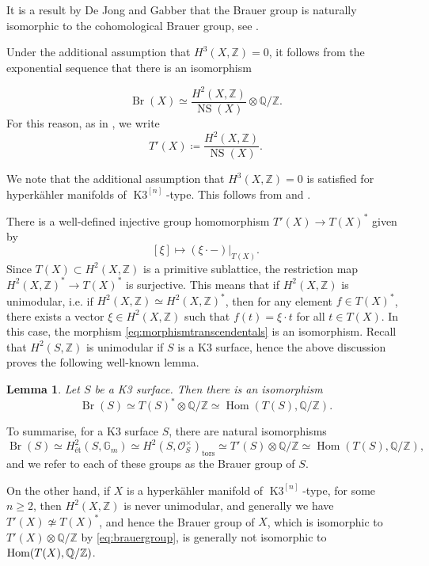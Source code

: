 \documentclass[11pt,twoside]{amsart}
\numberwithin{equation}{section}
\newtheorem{lemma}[dummy]{Lemma}
\theoremstyle{definition}
\theoremstyle{plain}
\newcommand{\Z}{\ensuremath{\mathbb{Z}}}
\newcommand{\Q}{\ensuremath{\mathbb{Q}}}
\newcommand{\bigo}{\ensuremath{\mathcal{O}}}
\def\NS{\operatorname{NS}}
\def\Br{\operatorname{Br}}
\def\Kn{{\ensuremath{\operatorname{K3}^{[n]}}}}
\begin{document}
It is a result by De Jong and Gabber that the Brauer group is naturally isomorphic to the cohomological Brauer group, see \cite[\S4.2]{CS21}.

Under the additional assumption that $H^3(X,\Z)=0$, it follows from the exponential sequence that there is an isomorphism 

\begin{equation}\label{eq:brauergroup}
    \Br(X)\simeq \frac{H^2(X,\Z)}{\NS(X)}\otimes \Q/\Z.
\end{equation}
For this reason, as in \cite{HM23}, we write 
\begin{equation}\label{eq:Tprime}
    T'(X) \coloneqq \frac{H^2(X,\Z)}{\NS(X)}.
\end{equation}

We note that the additional assumption that $H^3(X,\Z) = 0$ is satisfied for hyperk\"ahler manifolds of \Kn-type. This follows from \cite[Equation (2.1)]{Got02} and \cite[Theorem 1]{Mar07}.

There is a well-defined injective group homomorphism $T'(X)\to T(X)^*$ given by 
\begin{equation}\label{eq:morphismtranscendentals}[\xi]\mapsto (\xi\cdot-)|_{T(X)}.
\end{equation}
Since $T(X)\subset H^2(X,\Z)$ is a primitive sublattice, the restriction map $H^2(X,\Z)^*\to T(X)^*$ is surjective. This means that if $H^2(X,\Z)$ is unimodular, i.e. if $H^2(X,\Z)\simeq H^2(X,\Z)^*$, then for any element $f\in T(X)^*$, there exists a vector $\xi\in H^2(X,\Z)$ such that $f(t) = \xi\cdot t$ for all $t\in T(X)$. In this case, the morphism \eqref{eq:morphismtranscendentals} is an isomorphism.
Recall that $H^2(S,\Z)$ is unimodular if $S$ is a K3 surface, hence the above discussion proves the following well-known lemma.
\begin{lemma}\label{lem:brauerofak3}
    Let $S$ be a K3 surface. Then there is an isomorphism $$\Br(S)\simeq T(S)^*\otimes \Q/\Z\simeq \operatorname{Hom}(T(S),\Q/\Z).$$ 
\end{lemma}
To summarise, for a K3 surface $S$, there are natural isomorphisms 
\begin{equation}\label{eq:allthebrauergroups}
\Br(S)\simeq H^2_{\text{\'et}}(S,\mathbb{G}_m)\simeq H^2(S,\bigo_S^\times)_{\text{tors}}\simeq T'(S)\otimes\Q/\Z\simeq\operatorname{Hom}(T(S),\Q/\Z),
\end{equation}
and we refer to each of these groups as the Brauer group of $S$.

On the other hand, if $X$ is a hyperk\"ahler manifold of \Kn-type, for some $n\geq 2$, then $H^2(X,\Z)$ is never unimodular, and generally we have $T'(X)\not\simeq T(X)^*$, and hence the Brauer group of $X$, which is isomorphic to $T'(X)\otimes \Q/\Z$ by \eqref{eq:brauergroup}, is generally not isomorphic to $\Hom(T(X),\Q/\Z)$.
\end{document}
